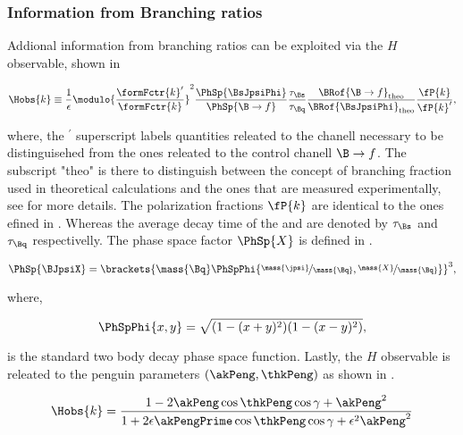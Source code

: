 \subsubsection{Information from Branching ratios}
Addional information from branching ratios can be exploited via the $H$ observable, shown in 

\begin{equation}
\centering
  \Hobs{k} \equiv   \frac{1}{\epsilon}
            \modulo{\frac{\formFctr{k}'}{\formFctr{k}}}^2
                    \frac{\PhSp{\BsJpsiPhi}} {\PhSp{\B\to f}}
                    \frac{\tau_{\Bs}}{\tau_{\Bq}}
                    \frac{\BRof{\B\to f}_{\rm theo}}{\BRof{\BsJpsiPhi}_{\rm theo}}
                    \frac{\fP{k}}{{\fP{k}'}},
\label{hobs_def}
\end{equation}

\noindent where, the ${}^\prime$ superscript labels quantities releated to the \BsJpsiPhi chanell necessary to be
distinguisehed from the ones releated to the control chanell $\B\to f$. The subscript "theo" is there to distinguish
between the concept of branching fraction used in theoretical calculations and the ones that are measured experimentally,
see  for more details. The polarization fractions $\fP{k}$ are identical to the ones
efined in . Whereas the average decay time of the \Bs and \Bq are denoted by $\tau_{\Bs}$ and $\tau_{\Bq}$
respectivelly. The phase space factor $\PhSp{X}$ is defined in .

\begin{equation}
\centering
   \PhSp{\BJpsiX}  = \brackets{ \mass{\Bq} \PhSpPhi{ \nicefrac{\mass{\jpsi}}{\mass{\Bq}}, \nicefrac{\mass{X}}{\mass{\Bq}}  } }^3,
\label{phase_space_eq_def}
\end{equation}

\noindent where,

\begin{equation}
\centering
   \PhSpPhi{x,y} = \sqrt{ (1-(x+y)^2)(1-(x-y)^2) },
\label{phase_space_phi_eq_def}
\end{equation}

\noindent is the standard two body decay phase space function. Lastly, the $H$ observable is releated to the penguin parameters
$(\akPeng,\thkPeng)$ as shown in .

\begin{equation}
\centering
  \Hobs{k} = \frac{1-2\akPeng\cos\thkPeng\cos\gamma + \akPeng^2}{1+2\epsilon\akPengPrime\cos\thkPeng\cos\gamma + \epsilon^2\akPeng^2}
\label{Hobs_peng_param}
\end{equation}

